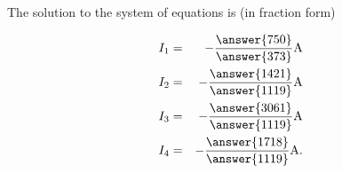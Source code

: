 \documentclass{ximera}
\begin{document}
\begin{exercise}
        The solution to the system of equations is (in fraction form)
  
      \begin{eqnarray*}
        I_1 &=& -\frac{\answer{750}}{\answer{373}} \amp \\
        I_2 &=& -\frac{\answer{1421}}{\answer{1119}} \amp \\
        I_3 &=& -\frac{\answer{3061}}{\answer{1119}} \amp \\
        I_4 &=& -\frac{\answer{1718}}{\answer{1119}} \amp.
      \end{eqnarray*}
  
  

\end{exercise}
\end{document}
